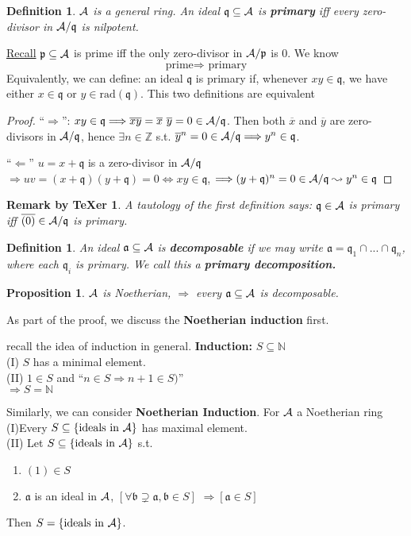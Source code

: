 \documentclass[11pt]{article}
\newtheorem{prop}[thm]{Proposition}
\newtheorem{dfn}[thm]{Definition}
\newtheorem{rmkt}[thm]{Remark by TeXer}
\newcommand{\intg}{\mathbb Z}
\newcommand{\sca}{{\mathfrak a}}
\newcommand{\scb}{{\mathfrak b}}
\newcommand{\scp}{{\mathfrak p}}
\newcommand{\scq}{\mathfrak q}
\newcommand{\cala}{{\cal A}}
\newcommand{\Lrta}{\Longrightarrow}
\newcommand{\Llta}{\Longleftarrow}
\newcommand{\Llrta}{\Longleftrightarrow}
\begin{document}
\begin{dfn}$\cala$ is a general ring. 
An ideal $\scq\subseteq\cala$ is \textbf{primary} iff every zero-divisor  in $\cala/\scq$ is nilpotent.
\end{dfn}
\underline{Recall} $\scp\subseteq\cala$ is prime iff the only zero-divisor  in $\cala/\scp$ is $0$. We know
$$
\text{prime}\Lrta\text{ primary}
$$
Equivalently, we can define: an ideal $\scq$ is primary if, whenever $xy\in\scq$, we have either $x\in\scq$ or $y\in \text{rad}(\scq)$. This two definitions are equivalent
\begin{proof}
``$\Lrta$'': $xy\in\scq\Lrta \overline{xy}=\overline{x}\ \overline{y}=0\in \cala/\scq $. Then both $\overline{x}$ and $\overline{y}$ are zero-divisors  in $\cala/\scq$, hence $\exists n\in\intg$ s.t. ${\overline{y}}^n=0\in \cala/\scq\Lrta y^n\in\scq$.

``$\Llta$'' $u=x+\scq$ is a zero-divisor  in $\cala/\scq$ $\Lrta uv=(x+\scq)(y+\scq)=0\Llrta xy\in\scq$, $\Lrta (y+\scq)^n=0\in\cala/\scq\leadsto y^n\in\scq$
\end{proof}
\begin{rmkt}\label{rmkt:primary}
A tautology of the first definition says: $\scq\in\cala$ is primary iff $\overline{(0)}\in\cala/\scq$ is primary.
\end{rmkt}
\begin{dfn}
An ideal $\sca\subseteq \cala$ is \textbf{decomposable} if we may write $\sca=\scq_1\cap...\cap \scq_n$, where each $\scq_i$ is primary. We call this a \textbf{primary decomposition.}
\end{dfn}
\begin{prop}
$\cala$ is Noetherian, $\Lrta$ every $\sca\subseteq \cala$ is decomposable. 
\end{prop}
As part of the proof, we discuss the \textbf{Noetherian induction} first.

recall the idea of induction in general.
\textbf{Induction:} $S\subseteq \mathbb{N}$\\
(I) $S$ has a minimal element.\\
(II) $1\in S$ and ``$n\in S\Lrta n+1\in S)$''\\
 $\Lrta S=\mathbb{N}$

Similarly, we can consider 
\textbf{Noetherian Induction}. For $\cala$ a Noetherian ring\\
(I)Every $S\subseteq\{\text{ideals in $\cala$}\}$  has maximal element.
\\
(II) Let $S\subseteq\{\text{ideals in $\cala$}\}$ s.t.
\begin{enumerate}[label=(\alph*)]
\item $(1)\in S$
\item $\sca$ is an ideal in $\cala$,  $[\forall \scb\supsetneq\sca, \scb\in S]$ $\Lrta [\sca\in S]$\\
\end{enumerate}
Then $S=\{\text{ideals in $\cala$}\}$.
\end{document}
